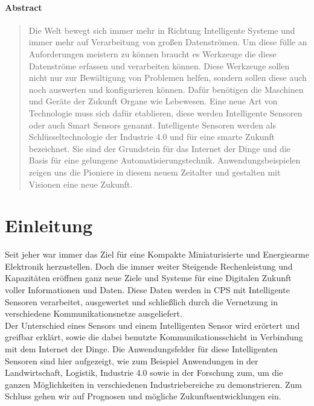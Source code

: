\documentclass[a4paper,12pt]{scrartcl}
\begin{document}
\paragraph{\large Abstract}
\begin{abstract}
Die Welt bewegt sich immer mehr in Richtung Intelligente Systeme und immer mehr auf Verarbeitung von großen Datenströmen. Um diese fülle an Anforderungen meistern zu können braucht es Werkzeuge die diese Datenströme erfassen und verarbeiten können. Diese Werkzeuge sollen nicht nur zur Bewältigung von Problemen helfen, sondern sollen diese auch noch auswerten und konfigurieren können. Dafür benötigen die Maschinen und Geräte der Zukunft Organe wie Lebewesen. Eine neue Art von Technologie muss sich dafür etablieren, diese werden Intelligente Sensoren oder auch Smart Sensors genannt.
Intelligente Sensoren werden als Schlüsseltechnologie der Industrie 4.0 und für eine smarte Zukunft bezeichnet. Sie sind der Grundstein für das Internet der Dinge und die Basis für eine gelungene Automatisierungstechnik. Anwendungsbeispielen zeigen uns die Pioniere in diesem neuem Zeitalter und gestalten mit Visionen eine neue Zukunft.
\end{abstract}


\section{Einleitung}
Seit jeher war immer das Ziel für eine Kompakte Miniaturisierte und Energiearme Elektronik herzustellen. Doch die immer weiter Steigende Rechenleistung und Kapazitäten eröffnen ganz neue Ziele und Systeme für eine Digitalen Zukunft voller Informationen und Daten. Diese Daten werden in CPS mit Intelligente Sensoren verarbeitet, ausgewertet und schließlich durch die Vernetzung in verschiedene Kommunikationsnetze ausgeliefert.\\
Der Unterschied eines Sensors und einem Intelligenten Sensor wird erörtert und greifbar erklärt, sowie die dabei benutzte Kommunikationsschicht in Verbindung mit dem Internet der Dinge.
Die Anwendungsfelder für diese Intelligenten Sensoren sind hier aufgezeigt, wie zum Beispiel Anwendungen in der Landwirtschaft, Logistik, Industrie 4.0 sowie in der Forschung zum, um die ganzen Möglichkeiten in verschiedenen Industriebereiche zu demonstrieren. Zum Schluss gehen wir auf Prognosen und mögliche Zukunftsentwicklungen ein.

\end{document}

